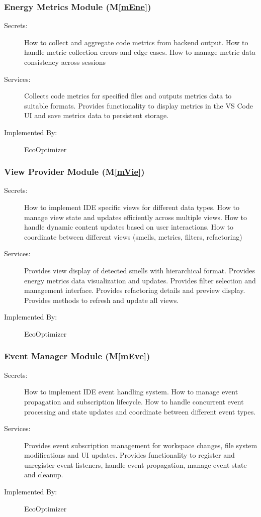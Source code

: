 \documentclass[12pt, titlepage]{article}
\newcommand{\mref}[1]{M\ref{#1}}
\begin{document}
\subsubsection{Energy Metrics Module (\mref{mEne})}

\begin{description}
    \item[Secrets:] How to collect and aggregate code metrics from backend output. How to handle metric collection errors and edge cases. How to manage metric data consistency across sessions
    \item[Services:] Collects code metrics for specified files and outputs metrics data to suitable formats. Provides functionality to display metrics in the VS Code UI and save metrics data to persistent storage.
    \item[Implemented By:] EcoOptimizer
\end{description}

\subsubsection{View Provider Module (\mref{mVie})}

\begin{description}
    \item[Secrets:] How to implement IDE specific views for different data types. How to manage view state and updates efficiently across multiple views. How to handle dynamic content updates based on user interactions. How to coordinate between different views (smells, metrics, filters, refactoring)
    \item[Services:] Provides view display of detected smells with hierarchical format. Provides energy metrics data visualization and updates. Provides filter selection and management interface. Provides refactoring details and preview display. Provides methods to refresh and update all views.
    \item[Implemented By:] EcoOptimizer
\end{description}

\subsubsection{Event Manager Module (\mref{mEve})}

\begin{description}
    \item[Secrets:] How to implement IDE event handling system. How to manage event propagation and subscription lifecycle. How to handle concurrent event processing and state updates and coordinate between different event types.
    \item[Services:] Provides event subscription management for workspace changes, file system modifications and UI updates. Provides functionality to register and unregister event listeners, handle event propagation, manage event state and cleanup.
    \item[Implemented By:] EcoOptimizer
\end{description}
\end{document}
